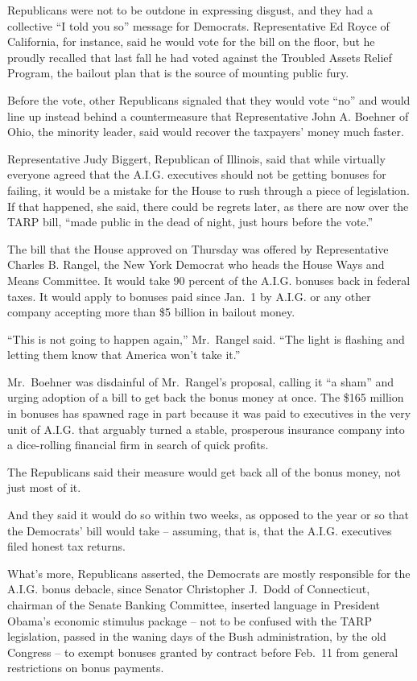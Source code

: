 \documentclass[12pt,a4paper,onecolumn]{article}
\begin{document}
\begin{CJK*}{GBK}{song}
Republicans were not to be outdone in expressing disgust, and they had a collective ``I told you
so'' message for Democrats. Representative Ed Royce of California, for instance, said he would vote
for the bill on the floor, but he proudly recalled that last fall he had voted against the Troubled
Assets Relief Program, the bailout plan that is the source of mounting public fury.

Before the vote, other Republicans signaled that they would vote ``no'' and would line up instead
behind a countermeasure that Representative John A. Boehner of Ohio, the minority leader, said would
recover the taxpayers' money much faster.

Representative Judy Biggert, Republican of Illinois, said that while virtually everyone agreed that
the A.I.G. executives should not be getting bonuses for failing, it would be a mistake for the House
to rush through a piece of legislation. If that happened, she said, there could be regrets later, as
there are now over the TARP bill, ``made public in the dead of night, just hours before the vote.''

The bill that the House approved on Thursday was offered by Representative Charles B. Rangel, the
New York Democrat who heads the House Ways and Means Committee. It would take 90 percent of the
A.I.G. bonuses back in federal taxes. It would apply to bonuses paid since Jan.~1 by A.I.G. or any
other company accepting more than \$5 billion in bailout money.

``This is not going to happen again,'' Mr.~Rangel said. ``The light is flashing and letting them
know that America won't take it.''

Mr.~Boehner was disdainful of Mr.~Rangel's proposal, calling it ``a sham'' and urging adoption of a
bill to get back the bonus money at once. The \$165 million in bonuses has spawned rage in part
because it was paid to executives in the very unit of A.I.G. that arguably turned a stable,
prosperous insurance company into a dice-rolling financial firm in search of quick profits.

The Republicans said their measure would get back all of the bonus money, not just most of it.

And they said it would do so within two weeks, as opposed to the year or so that the Democrats' bill
would take -- assuming, that is, that the A.I.G. executives filed honest tax returns.

What's more, Republicans asserted, the Democrats are mostly responsible for the A.I.G. bonus
debacle, since Senator Christopher J.~Dodd of Connecticut, chairman of the Senate Banking Committee,
inserted language in President Obama's economic stimulus package -- not to be confused with the TARP
legislation, passed in the waning days of the Bush administration, by the old Congress -- to exempt
bonuses granted by contract before Feb.~11 from general restrictions on bonus payments.


\end{CJK*}
\end{document}
